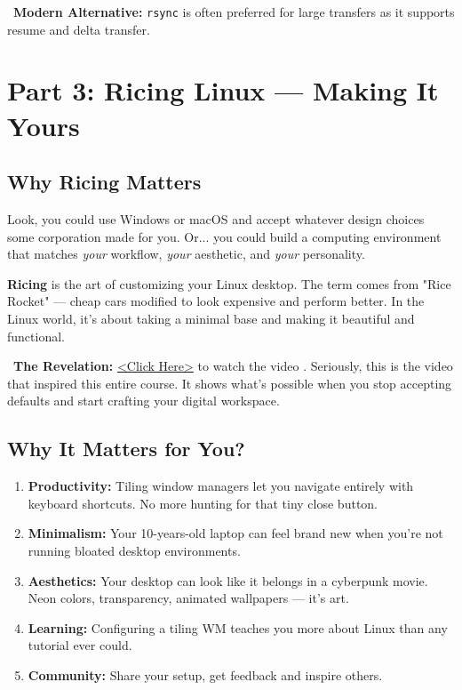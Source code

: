 \documentclass[12pt]{article}
\newcommand{\videoicon}{\faVideo}
\begin{document}
\begin{infobox}
\faSync\ \textbf{Modern Alternative:} \texttt{rsync} is often preferred for large transfers as it supports resume and delta transfer.
\end{infobox}

\section*{Part 3: Ricing Linux — Making It Yours}

\subsection*{Why Ricing Matters}

Look, you could use Windows or macOS and accept whatever design choices some corporation made for you. Or... you could build a computing environment that matches \textit{your} workflow, \textit{your} aesthetic, and \textit{your} personality.

\begin{infobox}
\textbf{Ricing} is the art of customizing your Linux desktop. The term comes from "Rice Rocket" — cheap cars modified to look expensive and perform better. In the Linux world, it's about taking a minimal base and making it beautiful and functional.
\end{infobox}

\begin{infobox}
\videoicon\ \textbf{The Revelation:} \href{https://youtu.be/z1-yuolwrVs?si=3IKioFlYz9L8vkNS}{<Click Here>} to watch the video . Seriously, this is the video that inspired this entire course. It shows what's possible when you stop accepting defaults and start crafting your digital workspace.
\end{infobox}

\subsection*{Why It Matters for You?}

\begin{enumerate}
    \item \textbf{Productivity:} Tiling window managers let you navigate entirely with keyboard shortcuts. No more hunting for that tiny close button.
    
    \item \textbf{Minimalism:} Your 10-years-old laptop can feel brand new when you're not running bloated desktop environments.
    
    \item \textbf{Aesthetics:} Your desktop can look like it belongs in a cyberpunk movie. Neon colors, transparency, animated wallpapers — it's art.
    
    \item \textbf{Learning:} Configuring a tiling WM teaches you more about Linux than any tutorial ever could.
    
    \item \textbf{Community:} Share your setup, get feedback and inspire others.
\end{enumerate}
\end{document}
